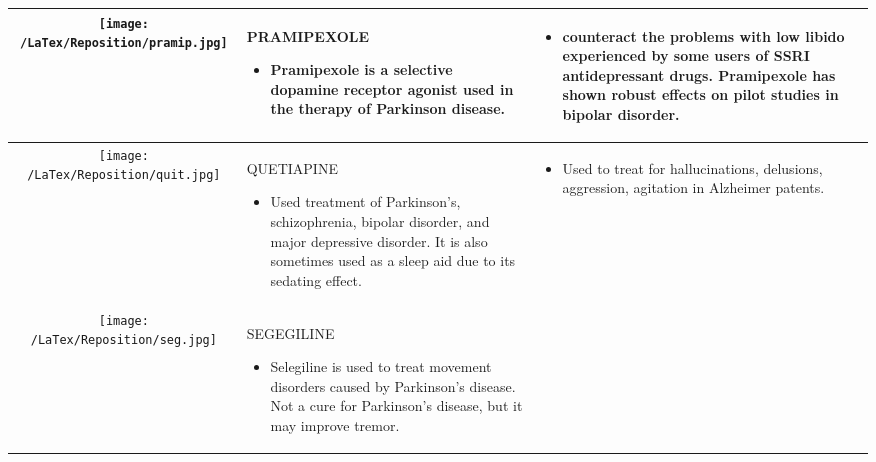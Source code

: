 \documentclass[preprint,12pt]{elsarticle}
\begin{document}
\begin{table}[h!]
\begin{tabular}{ | c | m{4.5cm} | m{4.5cm} | }
     \begin{minipage}{.3\textwidth}
      \texttt{[image: /LaTex/Reposition/pramip.jpg]}
    \end{minipage}
    & PRAMIPEXOLE
      \begin{itemize}
        \item Pramipexole is a selective dopamine receptor agonist used in the therapy of Parkinson disease. 
         
      \end{itemize}
    & 
      \begin{itemize}
        \item counteract the problems with low libido experienced by some users of SSRI antidepressant drugs. Pramipexole has shown robust effects on pilot studies in bipolar disorder.
            \end{itemize}
    \\ \hline
     \begin{minipage}{.3\textwidth}
      \texttt{[image: /LaTex/Reposition/quit.jpg]}
    \end{minipage}
    & QUETIAPINE
      \begin{itemize}
        \item Used treatment of Parkinson's, schizophrenia, bipolar disorder, and major depressive disorder. It is also sometimes used as a sleep aid due to its sedating effect. 
       
      \end{itemize}
    & 
      \begin{itemize}
        \item Used to treat for hallucinations, delusions, aggression, agitation in Alzheimer patents.
            \end{itemize}
    \\ \hline
     \begin{minipage}{.3\textwidth}
      \texttt{[image: /LaTex/Reposition/seg.jpg]}
    \end{minipage}
    & SEGEGILINE
      \begin{itemize}
        \item Selegiline  is used to treat movement disorders caused by Parkinson's disease. Not a cure for Parkinson's disease, but it may improve tremor.


\end{itemize}
\end{tabular}
\end{table}
\end{document}
